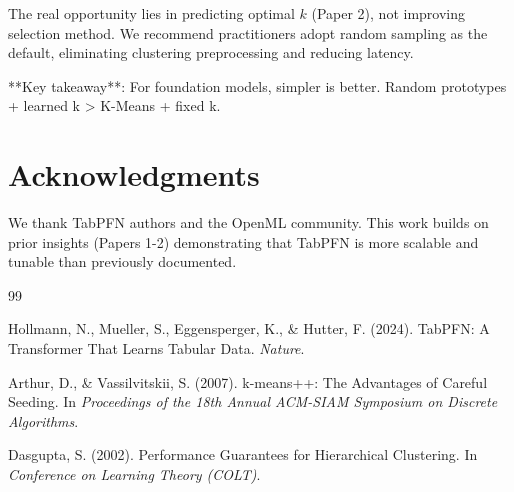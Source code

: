 \documentclass[11pt,a4paper]{article}
\begin{document}
The real opportunity lies in predicting optimal $k$ (Paper 2), not improving selection method. We recommend practitioners adopt random sampling as the default, eliminating clustering preprocessing and reducing latency.

**Key takeaway**: For foundation models, simpler is better. Random prototypes + learned k > K-Means + fixed k.

\section*{Acknowledgments}

We thank TabPFN authors and the OpenML community. This work builds on prior insights (Papers 1-2) demonstrating that TabPFN is more scalable and tunable than previously documented.

\begin{thebibliography}{99}

Hollmann, N., Mueller, S., Eggensperger, K., \& Hutter, F. (2024).
TabPFN: A Transformer That Learns Tabular Data.
\textit{Nature}.

Arthur, D., \& Vassilvitskii, S. (2007).
k-means++: The Advantages of Careful Seeding.
In \textit{Proceedings of the 18th Annual ACM-SIAM Symposium on Discrete Algorithms}.

Dasgupta, S. (2002).
Performance Guarantees for Hierarchical Clustering.
In \textit{Conference on Learning Theory (COLT)}.

\end{thebibliography}
\end{document}
